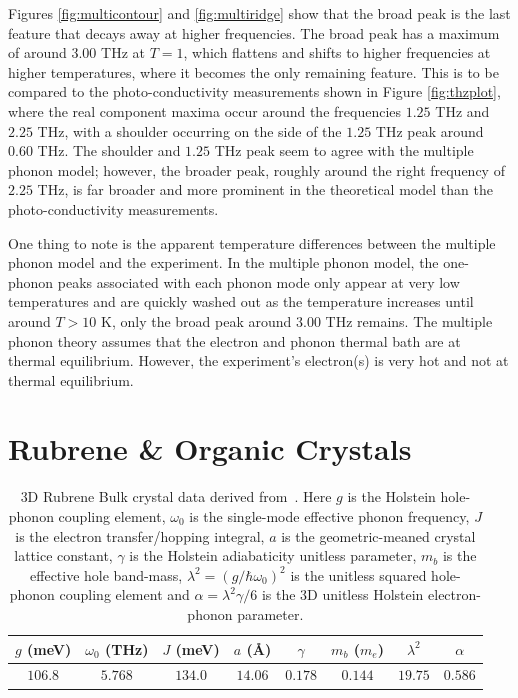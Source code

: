 Figures \ref{fig:multicontour} and \ref{fig:multiridge} show that the broad peak is the last feature that decays away at higher frequencies. The broad peak has a maximum of around $3.00$ THz at $T = 1$, which flattens and shifts to higher frequencies at higher temperatures, where it becomes the only remaining feature. This is to be compared to the photo-conductivity measurements shown in Figure \ref{fig:thzplot}, where the real component maxima occur around the frequencies $1.25$ THz and $2.25$ THz, with a shoulder occurring on the side of the $1.25$ THz peak around $0.60$ THz. The shoulder and $1.25$ THz peak seem to agree with the multiple phonon model; however, the broader peak, roughly around the right frequency of $2.25$ THz, is far broader and more prominent in the theoretical model than the photo-conductivity measurements. 

One thing to note is the apparent temperature differences between the multiple phonon model and the experiment. In the multiple phonon model, the one-phonon peaks associated with each phonon mode only appear at very low temperatures and are quickly washed out as the temperature increases until around $T > 10$ K, only the broad peak around $3.00$ THz remains. The multiple phonon theory assumes that the electron and phonon thermal bath are at thermal equilibrium. However, the experiment's electron(s) is very hot and not at thermal equilibrium.

\section{Rubrene \& Organic Crystals}
\label{sec:chap-sixth-second}

\begin{table}
\centering
\begin{tabular*}{\textwidth}{@{\extracolsep{\fill}}cccccccc}
    \toprule
    $g$ (meV) & $\omega_0$ (THz) & $J$ (meV) & $a$ (Å) & $\gamma$ & $m_b$ ($m_e$) & $\lambda^2$ & $\alpha$ \\
    \midrule
     $106.8$ & $5.768$ & $134.0$ & $14.06$ & $0.178$ & $0.144$ & $19.75$ & $0.586$ \\
    \bottomrule
\end{tabular*}
\caption{3D Rubrene Bulk crystal data derived from~\cite{Ordejn2017}. Here $g$ is the Holstein hole-phonon coupling element, $\omega_0$ is the single-mode effective phonon frequency, $J$ is the electron transfer/hopping integral, $a$ is the geometric-meaned crystal lattice constant, $\gamma$ is the Holstein adiabaticity unitless parameter, $m_b$ is the effective hole band-mass, $\lambda^2 = (g / \hbar\omega_0)^2$ is the unitless squared hole-phonon coupling element and $\alpha = \lambda^2 \gamma / 6$ is the 3D unitless Holstein electron-phonon parameter.}
\label{tab:rubrene_data}
\end{table}

